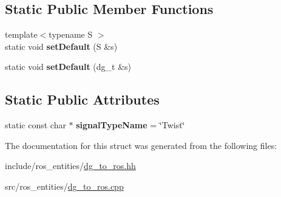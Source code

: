 \subsection*{Static Public Member Functions}
\begin{DoxyCompactItemize}
\item 
{\footnotesize template$<$typename S $>$ }\\static void {\bfseries set\+Default} (S \&s)\hypertarget{structdynamic__graph_1_1DgToRos_3_01specific_1_1Twist_01_4_a103fc59c5fe83026969506d6720d24cd}{}\label{structdynamic__graph_1_1DgToRos_3_01specific_1_1Twist_01_4_a103fc59c5fe83026969506d6720d24cd}

\item 
static void {\bfseries set\+Default} (dg\+\_\+t \&s)\hypertarget{structdynamic__graph_1_1DgToRos_3_01specific_1_1Twist_01_4_a80fcec4f775fd6426af80fa7f819fa9a}{}\label{structdynamic__graph_1_1DgToRos_3_01specific_1_1Twist_01_4_a80fcec4f775fd6426af80fa7f819fa9a}

\end{DoxyCompactItemize}
\subsection*{Static Public Attributes}
\begin{DoxyCompactItemize}
\item 
static const char $\ast$ {\bfseries signal\+Type\+Name} = \char`\"{}Twist\char`\"{}\hypertarget{structdynamic__graph_1_1DgToRos_3_01specific_1_1Twist_01_4_a54d45a12202156921071c9b7d3c83a62}{}\label{structdynamic__graph_1_1DgToRos_3_01specific_1_1Twist_01_4_a54d45a12202156921071c9b7d3c83a62}

\end{DoxyCompactItemize}


The documentation for this struct was generated from the following files\+:\begin{DoxyCompactItemize}
\item 
include/ros\+\_\+entities/\hyperlink{dg__to__ros_8hh}{dg\+\_\+to\+\_\+ros.\+hh}\item 
src/ros\+\_\+entities/\hyperlink{dg__to__ros_8cpp}{dg\+\_\+to\+\_\+ros.\+cpp}\end{DoxyCompactItemize}
